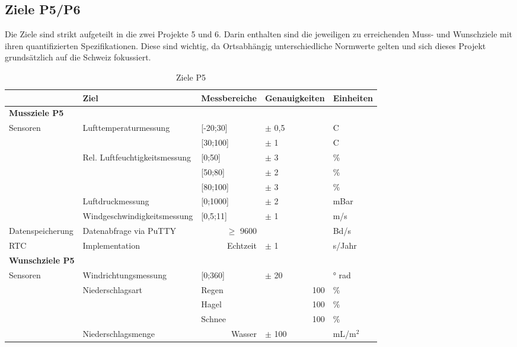 \begin{landscape}
\section{Ziele P5/P6}
Die Ziele sind strikt aufgeteilt in die zwei Projekte 5 und 6. Darin enthalten sind die jeweiligen zu erreichenden Muss- und Wunschziele mit ihren quantifizierten Spezifikationen. Diese sind wichtig, da Ortsabhängig unterschiedliche Normwerte gelten und sich dieses Projekt grundsätzlich auf die Schweiz fokussiert.\\
\begin{table}[htbp]
  \centering
  \caption{Ziele P5}
    \begin{tabular}{r|l|r|l|l}
          & \textbf{Ziel} & \multicolumn{1}{l|}{\textbf{Messbereiche}} & \textbf{Genauigkeiten} & \textbf{Einheiten} \\
    \toprule
    \multicolumn{1}{l}{\textbf{Mussziele P5}} & \multicolumn{1}{r}{} & \multicolumn{1}{r}{} & \multicolumn{1}{r}{} &  \\
    \toprule
    \multicolumn{1}{l|}{Sensoren} & Lufttemperaturmessung & \multicolumn{1}{l|}{[-20;30]} & $\pm$ 0,5 & C \\
          &       & \multicolumn{1}{l|}{[30;100]} & $\pm$ 1   & C \\
\cline{2-5}           & Rel. Luftfeuchtigkeitsmessung & \multicolumn{1}{l|}{[0;50]} & $\pm$ 3   & \% \\
          &       & \multicolumn{1}{l|}{[50;80]} & $\pm$ 2   & \% \\
          &       & \multicolumn{1}{l|}{[80;100]} & $\pm$ 3   & \% \\
\cline{2-5}           & Luftdruckmessung & \multicolumn{1}{l|}{[0;1000]} & $\pm$ 2   & mBar \\
\cline{2-5}          & Windgeschwindigkeitsmessung & \multicolumn{1}{l|}{[0,5;11]} & $\pm$ 1   & m/s \\
    \hline
    \multicolumn{1}{l|}{Datenspeicherung} & Datenabfrage via PuTTY &   $\geq$ 9600    &       &  Bd/s\\
    \hline
    \multicolumn{1}{l|}{RTC} & Implementation &   Echtzeit    & $\pm$ 1   & s/Jahr \\
    \bottomrule
    \multicolumn{1}{l}{\textbf{Wunschziele P5}} & \multicolumn{1}{r}{} & \multicolumn{1}{r}{} & \multicolumn{1}{r}{} &  \\
    \toprule
    \multicolumn{1}{l|}{Sensoren} & Windrichtungsmessung & \multicolumn{1}{l|}{[0;360]} & $\pm$ 20  & ° rad \\
\cline{2-5}           & Niederschlagsart & \multicolumn{1}{l|}{Regen} & \multicolumn{1}{r|}{100} & \% \\
          &       & \multicolumn{1}{l|}{Hagel} & \multicolumn{1}{r|}{100} & \% \\
          &       & \multicolumn{1}{l|}{Schnee} & \multicolumn{1}{r|}{100} & \% \\
\cline{2-5}           & Niederschlagsmenge &   Wasser    & $\pm$ 100 & mL/m$^2$ \\
\bottomrule
    \end{tabular}%
  \label{tab:ZieleP5}%
\end{table}%


\end{landscape}
